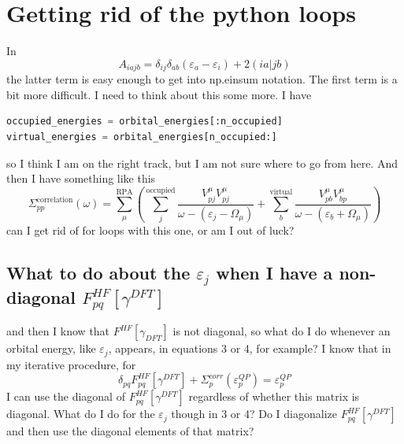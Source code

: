 \documentclass[12pt]{article}
\begin{document}
\section{Getting rid of the python loops}
In 
\begin{equation}
    A_{iajb}=\delta _{ij} \delta _{ab} \left(\varepsilon _{a}-\varepsilon _{i}\right) + 2(ia|jb)
\end{equation}
the latter term is easy enough to get into np.einsum notation. The first term is a bit more difficult. I need to think about this some more. I have
\begin{lstlisting}[language=Python]
occupied_energies = orbital_energies[:n_occupied]
virtual_energies = orbital_energies[n_occupied:]
\end{lstlisting}
so I think I am on the right track, but I am not sure where to go from here.
And then I have something like this
\begin{equation}
    \Sigma_{pp}^{\text{correlation}}(\omega) = \sum_{\mu }^{\text{RPA}}\left(\sum_{j}^{\text{occupied}} \frac{V_{pj}^{\mu }V_{pj}^{\mu }}{\omega -(\varepsilon _{j}-\Omega  _{\mu })}+ \sum_{b}^{\text{virtual}} \frac{V_{pb}^{\mu }V_{bp}^{\mu }}{\omega -(\varepsilon _{b}+\Omega  _{\mu })}\right)
\end{equation}
can I get rid of for loops with this one, or am I out of luck?
\subsection{What to do about the $\varepsilon_{j}$ when I have a non-diagonal $F_{pq}^{HF}[\gamma^{DFT }]$}
and then I know that $F^{HF}[\gamma _{DFT}]$ is not diagonal, so what do I do whenever an orbital energy, like $\varepsilon _{j}$, appears, in equations 3 or 4, for example? I know that in my iterative procedure, for
\begin{equation}
    \delta_{pq}F_{pq}^{HF}[\gamma^{DFT }] + \Sigma_{p}^{corr}(\varepsilon_{p}^{QP}) = \varepsilon_{p}^{QP}
\end{equation}
I can use the diagonal of $F_{pq}^{HF}[\gamma^{DFT }]$ regardless of whether this matrix is diagonal. What do I do for the $\varepsilon_{j}$ though in 3 or 4? Do I diagonalize $F_{pq}^{HF}[\gamma^{DFT }]$ and then use the diagonal elements of that matrix?
\end{document}
